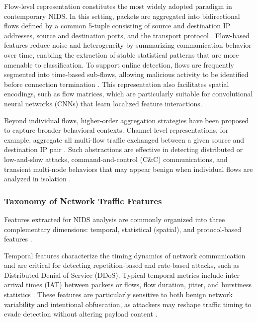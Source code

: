 Flow-level representation constitutes the most widely adopted paradigm in contemporary NIDS. In this setting, packets are aggregated into bidirectional flows defined by a common 5-tuple consisting of source and destination IP addresses, source and destination ports, and the transport protocol \cite{hartl2020explainability}. Flow-based features reduce noise and heterogeneity by summarizing communication behavior over time, enabling the extraction of stable statistical patterns that are more amenable to classification. To support online detection, flows are frequently segmented into time-based sub-flows, allowing malicious activity to be identified before connection termination \cite{doriguzzi2020lucid}. This representation also facilitates spatial encodings, such as flow matrices, which are particularly suitable for convolutional neural networks (CNNs) that learn localized feature interactions.

Beyond individual flows, higher-order aggregation strategies have been proposed to capture broader behavioral contexts. Channel-level representations, for example, aggregate all multi-flow traffic exchanged between a given source and destination IP pair \cite{cui2023cbseq}. Such abstractions are effective in detecting distributed or low-and-slow attacks, command-and-control (C\&C) communications, and transient multi-node behaviors that may appear benign when individual flows are analyzed in isolation \cite{zhao2025unified}.

\subsubsection{Taxonomy of Network Traffic Features}

Features extracted for NIDS analysis are commonly organized into three complementary dimensions: temporal, statistical (spatial), and protocol-based features \cite{han2021evaluating}.

Temporal features characterize the timing dynamics of network communication and are critical for detecting repetition-based and rate-based attacks, such as Distributed Denial of Service (DDoS). Typical temporal metrics include inter-arrival times (IAT) between packets or flows, flow duration, jitter, and burstiness statistics \cite{doriguzzi2020lucid, he2023adversarial}. These features are particularly sensitive to both benign network variability and intentional obfuscation, as attackers may reshape traffic timing to evade detection without altering payload content \cite{han2021evaluating}.

